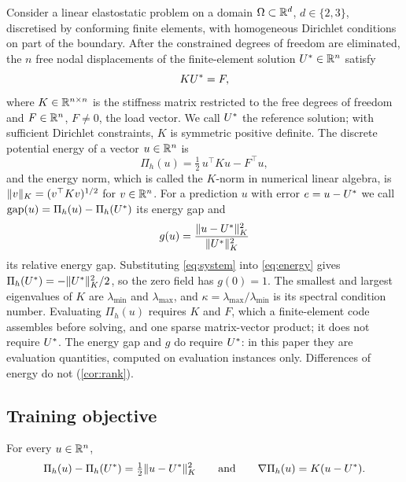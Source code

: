 Consider a linear elastostatic problem on a domain $\Omega\subset\mathbb{R}^{d}$, $d\in\{2,3\}$,
discretised by conforming finite elements, with homogeneous Dirichlet conditions on part
of the boundary. After the constrained degrees of freedom are eliminated, the $n$ free
nodal displacements of the finite-element solution $U^{\ast}\in\mathbb{R}^{n}$ satisfy
\begin{equation}
KU^{\ast} = F,
\label{eq:system}
\end{equation}
where $K\in\mathbb{R}^{n\times n}$ is the stiffness matrix restricted to the free degrees of
freedom and $F\in\mathbb{R}^{n}$, $F\neq0$, the load vector. We call $U^{\ast}$ the reference
solution; with sufficient Dirichlet constraints, $K$ is symmetric positive definite. The
discrete potential energy of a vector $u\in\mathbb{R}^{n}$ is
\begin{equation}
\Pi_h(u) = \tfrac12\,u^{\top}Ku - F^{\top}u ,
\label{eq:energy}
\end{equation}
and the energy norm, which is called the $K$-norm in numerical linear algebra, is
$\lVert v\rVert_K=(v^{\top}Kv)^{1/2}$ for $v\in\mathbb{R}^{n}$. For a prediction $u$ with error
$e=u-U^{\ast}$ we call $\operatorname{gap}(u)=\Pi_h(u)-\Pi_h(U^{\ast})$ its energy gap and
\begin{equation}
g(u) = \frac{\lVert u-U^{\ast}\rVert_K^{2}}{\lVert U^{\ast}\rVert_K^{2}}
\label{eq:relgap}
\end{equation}
its relative energy gap. Substituting \eqref{eq:system} into \eqref{eq:energy} gives
$\Pi_h(U^{\ast})=-\lVert U^{\ast}\rVert_K^2/2$, so the zero field has $g(0)=1$. The smallest and
largest eigenvalues of $K$ are $\lambda_{\min}$ and $\lambda_{\max}$, and
$\kappa=\lambda_{\max}/\lambda_{\min}$ is its spectral condition number. Evaluating
$\Pi_h(u)$ requires $K$ and $F$, which a finite-element code assembles before solving,
and one sparse matrix-vector product; it does not require $U^{\ast}$. The energy gap and $g$
do require $U^{\ast}$: in this paper they are evaluation quantities, computed on evaluation
instances only. Differences of energy do not (\cref{cor:rank}).

\subsection{Training objective}\label{sec:theory:exact}

\begin{lemma}[Exactness]\label{lem:exact}
For every $u\in\mathbb{R}^{n}$,
\begin{equation}
\Pi_h(u)-\Pi_h(U^{\ast}) = \tfrac12\lVert u-U^{\ast}\rVert_K^{2}
\qquad\text{and}\qquad
\nabla\Pi_h(u) = K(u-U^{\ast}).
\label{eq:exact}
\end{equation}
\end{lemma}

